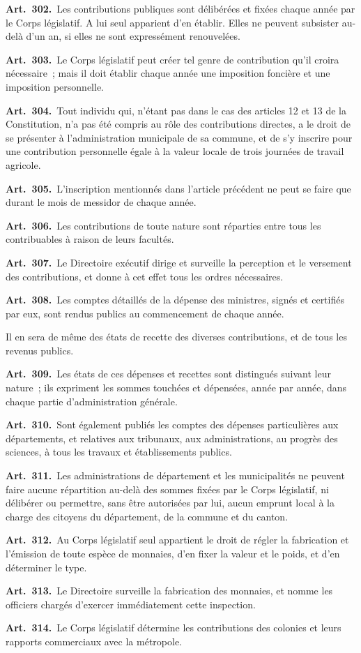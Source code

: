 \documentclass[french,twoside]{book} %
\newcommand{\labelchar}[1]{\textbf{\color{rubric} #1}}
\begin{document}
\labelchar{Art. 302.} Les contributions publiques sont délibérées et fixées chaque année par le Corps législatif. A lui seul apparient d’en établir. Elles ne peuvent subsister au-delà d’un an, si elles ne sont expressément renouvelées.\par
\labelchar{Art. 303.} Le Corps législatif peut créer tel genre de contribution qu’il croira nécessaire ; mais il doit établir chaque année une imposition foncière et une imposition personnelle.\par
\labelchar{Art. 304.} Tout individu qui, n’étant pas dans le cas des articles 12 et 13 de la Constitution, n’a pas été compris au rôle des contributions directes, a le droit de se présenter à l’administration municipale de sa commune, et de s’y inscrire pour une contribution personnelle égale à la valeur locale de trois journées de travail agricole.\par
\labelchar{Art. 305.} L’inscription mentionnés dans l’article précédent ne peut se faire que durant le mois de messidor de chaque année.\par
\labelchar{Art. 306.} Les contributions de toute nature sont réparties entre tous les contribuables à raison de leurs facultés.\par
\labelchar{Art. 307.} Le Directoire exécutif dirige et surveille la perception et le versement des contributions, et donne à cet effet tous les ordres nécessaires.\par
\labelchar{Art. 308.} Les comptes détaillés de la dépense des ministres, signés et certifiés par eux, sont rendus publics au commencement de chaque année.\par
Il en sera de même des états de recette des diverses contributions, et de tous les revenus publics.\par
\labelchar{Art. 309.} Les états de ces dépenses et recettes sont distingués suivant leur nature ; ils expriment les sommes touchées et dépensées, année par année, dans chaque partie d’administration générale.\par
\labelchar{Art. 310.} Sont également publiés les comptes des dépenses particulières aux départements, et relatives aux tribunaux, aux administrations, au progrès des sciences, à tous les travaux et établissements publics.\par
\labelchar{Art. 311.} Les administrations de département et les municipalités ne peuvent faire aucune répartition au-delà des sommes fixées par le Corps législatif, ni délibérer ou permettre, sans être autorisées par lui, aucun emprunt local à la charge des citoyens du département, de la commune et du canton.\par
\labelchar{Art. 312.} Au Corps législatif seul appartient le droit de régler la fabrication et l’émission de toute espèce de monnaies, d’en fixer la valeur et le poids, et d’en déterminer le type.\par
\labelchar{Art. 313.} Le Directoire surveille la fabrication des monnaies, et nomme les officiers chargés d’exercer immédiatement cette inspection.\par
\labelchar{Art. 314.} Le Corps législatif détermine les contributions des colonies et leurs rapports commerciaux avec la métropole.
\end{document}
